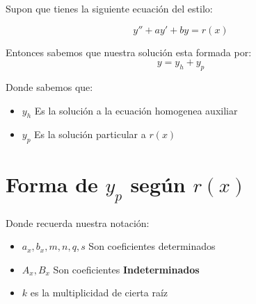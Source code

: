 \documentclass[12pt]{report}                               %
\begin{document}
        Supon que tienes la siguiente ecuación del estilo:

        \begin{equation}
            y'' + ay' + by = r(x)
        \end{equation}

        Entonces sabemos que nuestra solución esta formada por:
        \begin{equation}
            y = y_h + y_p
        \end{equation}

        Donde sabemos que:
        \begin{itemize}
            \item $y_h$ Es la solución a la ecuación homogenea auxiliar
            \item $y_p$ Es la solución particular a $r(x)$
        \end{itemize}


    \section{Forma de $y_p$ según $r(x)$}

        Donde recuerda nuestra notación:
        \begin{itemize}
            \item $a_x, b_x, m, n, q, s$ Son coeficientes determinados
            \item $A_x , B_x$ Son coeficientes \textbf{Indeterminados}
            \item $k$ es la multiplicidad de cierta raíz
        \end{itemize}
\end{document}
